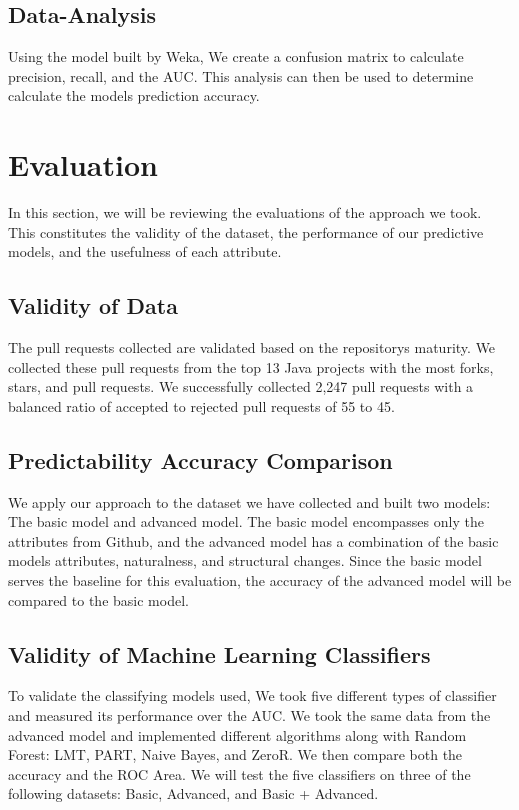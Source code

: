 \documentclass[10pt, conference]{IEEEtran}
\begin{document}
\subsection{Data-Analysis}
Using the model built by Weka, We create a confusion matrix to calculate precision, recall, and the AUC. This analysis can then be used to determine calculate the model\textquotesingle s prediction accuracy.

\section{Evaluation}
\label{evaluation}
In this section, we will be reviewing the evaluations of the approach we took. This constitutes the validity of the dataset, the performance of our predictive models, and the usefulness of each attribute.

\subsection{Validity of Data}
The pull requests collected are validated based on the repository\textquotesingle s maturity. We collected these pull requests from the top 13 Java projects with the most forks, stars, and pull requests. We successfully collected 2,247 pull requests with a balanced ratio of accepted to rejected pull requests of 55 to 45.

\subsection{Predictability Accuracy Comparison}
We apply our approach to the dataset we have collected and built two models: The basic model and advanced model. The basic model encompasses only the attributes from Github, and the advanced model has a combination of the basic model\textquotesingle s attributes, naturalness, and structural changes. Since the basic model serves the baseline for this evaluation, the accuracy of the advanced model will be compared to the basic model. 

\subsection{Validity of Machine Learning Classifiers}
To validate the classifying models used, We took five different types of classifier and measured its performance over the AUC. We took the same data from the advanced model and implemented different algorithms along with Random Forest: LMT, PART, Naive Bayes, and ZeroR. We then compare both the accuracy and the ROC Area. We will test the five classifiers on three of the following datasets: Basic, Advanced, and Basic + Advanced.
\end{document}
